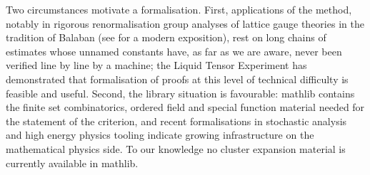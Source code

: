 \documentclass[11pt]{amsart}
\begin{document}
Two circumstances motivate a formalisation. First, applications of the
method, notably in rigorous renormalisation group analyses of lattice gauge
theories in the tradition of Balaban (see \cite{Dim13a,Dim13b,Dim13c} for a
modern exposition), rest on long chains of estimates whose unnamed constants
have, as far as we are aware, never been verified line by line by a machine;
the Liquid Tensor Experiment \cite{LTE} has demonstrated that formalisation
of proofs at this level of technical difficulty is feasible and useful.
Second, the library situation is favourable: \textsf{mathlib}
\cite{mathlib20} contains the finite set combinatorics, ordered field and
special function material needed for the statement of the criterion, and
recent formalisations in stochastic analysis \cite{BM25} and high energy
physics tooling \cite{HepLean} indicate growing infrastructure on the
mathematical physics side. To our knowledge no cluster expansion material is
currently available in \textsf{mathlib}.
\end{document}
